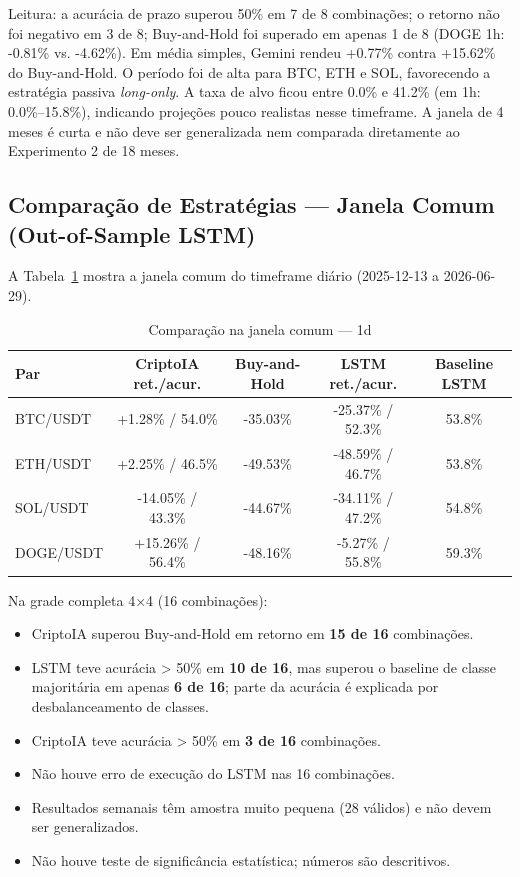 \documentclass[conference]{IEEEtran}
\begin{document}
Leitura: a acurácia de prazo superou 50\% em 7 de 8 combinações; o retorno não foi negativo em 3 de 8; Buy-and-Hold foi superado em apenas 1 de 8 (DOGE 1h: -0.81\% vs. -4.62\%). Em média simples, Gemini rendeu +0.77\% contra +15.62\% do Buy-and-Hold. O período foi de alta para BTC, ETH e SOL, favorecendo a estratégia passiva \textit{long-only}. A taxa de alvo ficou entre 0.0\% e 41.2\% (em 1h: 0.0\%–15.8\%), indicando projeções pouco realistas nesse timeframe. A janela de 4 meses é curta e não deve ser generalizada nem comparada diretamente ao Experimento 2 de 18 meses.

\subsection{Comparação de Estratégias — Janela Comum (Out-of-Sample LSTM)}

A Tabela~\ref{tab:comparacao_1d} mostra a janela comum do timeframe diário (2025-12-13 a 2026-06-29).

\begin{table}[t]
  \centering
  \caption{Comparação na janela comum — 1d}
  \label{tab:comparacao_1d}
  \small
  \begin{tabular}{lcccc}
    \toprule
    Par & CriptoIA ret./acur. & Buy-and-Hold & LSTM ret./acur. & Baseline LSTM \\
    \midrule
    BTC/USDT & +1.28\% / 54.0\% & -35.03\% & -25.37\% / 52.3\% & 53.8\% \\
    ETH/USDT & +2.25\% / 46.5\% & -49.53\% & -48.59\% / 46.7\% & 53.8\% \\
    SOL/USDT & -14.05\% / 43.3\% & -44.67\% & -34.11\% / 47.2\% & 54.8\% \\
    DOGE/USDT& +15.26\% / 56.4\% & -48.16\% & -5.27\%  / 55.8\% & 59.3\% \\
    \bottomrule
  \end{tabular}
\end{table}

Na grade completa 4×4 (16 combinações):
\begin{itemize}
  \item CriptoIA superou Buy-and-Hold em retorno em \textbf{15 de 16} combinações.
  \item LSTM teve acurácia > 50\% em \textbf{10 de 16}, mas superou o baseline de classe majoritária em apenas \textbf{6 de 16}; parte da acurácia é explicada por desbalanceamento de classes.
  \item CriptoIA teve acurácia > 50\% em \textbf{3 de 16} combinações.
  \item Não houve erro de execução do LSTM nas 16 combinações.
  \item Resultados semanais têm amostra muito pequena (28 válidos) e não devem ser generalizados.
  \item Não houve teste de significância estatística; números são descritivos.
\end{itemize}
\end{document}
